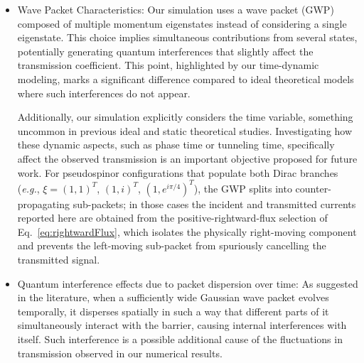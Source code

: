 \begin{itemize}
    \item Wave Packet Characteristics:
    Our simulation uses a wave packet (GWP) composed of multiple momentum eigenstates instead of considering a single eigenstate.
    This choice implies simultaneous contributions from several states, potentially generating quantum interferences that slightly affect the transmission coefficient\cite{Staelens2021}.
    This point, highlighted by our time-dynamic modeling, marks a significant difference compared to ideal theoretical models where such interferences do not appear.

    Additionally, our simulation explicitly considers the time variable, something uncommon in previous ideal and static theoretical studies.
    Investigating how these dynamic aspects, such as phase time or tunneling time, specifically affect the observed transmission is an important objective proposed for future work.
    For pseudospinor configurations that populate both Dirac branches (\textit{e.g.}, $\xi=(1,1)^T$, $(1,i)^T$, $(1,e^{i\pi/4})^T$), the GWP splits into counter-propagating sub-packets; in those cases the incident and transmitted currents reported here are obtained from the positive-rightward-flux selection of Eq.~\eqref{eq:rightwardFlux}, which isolates the physically right-moving component and prevents the left-moving sub-packet from spuriously cancelling the transmitted signal.

    \item Quantum interference effects due to packet dispersion over time:
    As suggested in the literature\cite{MolgadoMex2018}, when a sufficiently wide Gaussian wave packet evolves temporally, it disperses spatially in such a way that different parts of it simultaneously interact with the barrier, causing internal interferences with itself.
    Such interference is a possible additional cause of the fluctuations in transmission observed in our numerical results.
\end{itemize}
    
